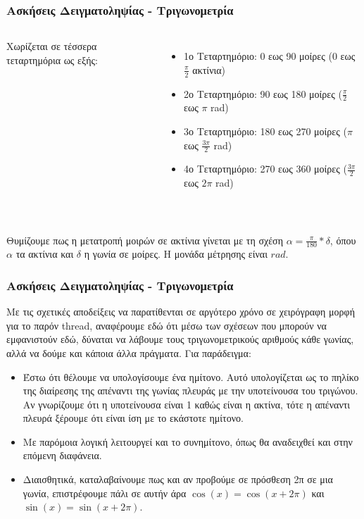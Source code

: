 \documentclass{beamer}
\begin{document}
\begin{frame}
	\frametitle{Ασκήσεις Δειγματοληψίας -  Τριγωνομετρία}
	\begin{columns}
		
		
		\centering
		Χωρίζεται σε τέσσερα τεταρτημόρια ως εξής:
		\begin{itemize}
			\item 1ο Τεταρτημόριο: 0 εως 90 μοίρες ($0$ εως $\frac{\pi}{2}$ ακτίνια)
			\item 2ο Τεταρτημόριο: 90 εως 180 μοίρες ($\frac{\pi}{2}$ εως $\pi$ \textlatin{rad})
			\item 3ο Τεταρτημόριο: 180 εως 270 μοίρες ($\pi$ εως $\frac{3\pi}{2}$ \textlatin{rad})
			\item 4ο Τεταρτημόριο: 270 εως 360 μοίρες ($\frac{3\pi}{2}$ εως $2\pi$ \textlatin{rad})
		 \end{itemize}
	\end{columns}
~\\
Θυμίζουμε πως η μετατροπή μοιρών σε ακτίνια γίνεται με τη σχέση $\alpha = \frac{\pi}{180} * \delta$, όπου $\alpha$ τα ακτίνια και $\delta$ η γωνία σε μοίρες. Η μονάδα μέτρησης είναι $rad$.
\end{frame}

\begin{frame}
	\frametitle{Ασκήσεις Δειγματοληψίας -  Τριγωνομετρία}
	Με τις σχετικές αποδείξεις να παρατίθενται σε αργότερο χρόνο σε χειρόγραφη μορφή για το παρόν \textlatin{thread}, αναφέρουμε εδώ ότι μέσω των σχέσεων που μπορούν να εμφανιστούν εδώ, δύναται να λάβουμε τους τριγωνομετρικούς αριθμούς κάθε γωνίας, αλλά να δούμε και κάποια άλλα πράγματα. Για παράδειγμα:
	\begin{itemize}
		\item Έστω ότι θέλουμε να υπολογίσουμε ένα ημίτονο. Αυτό υπολογίζεται ως το πηλίκο της διαίρεσης της απέναντι της γωνίας πλευράς με την υποτείνουσα του τριγώνου. \pause Αν γνωρίζουμε ότι η υποτείνουσα είναι 1 καθώς είναι η ακτίνα, τότε η απέναντι πλευρά ξέρουμε ότι είναι ίση με το εκάστοτε ημίτονο.
		\item Με παρόμοια λογική λειτουργεί και το συνημίτονο, όπως θα αναδειχθεί και στην επόμενη διαφάνεια.
		\item Διαισθητικά, καταλαβαίνουμε πως και αν προβούμε σε πρόσθεση 2π σε μια γωνία, επιστρέφουμε πάλι σε αυτήν άρα $\cos(x) = \cos(x+2\pi)$ και $\sin(x) = \sin(x+2\pi)$.
	\end{itemize}
\end{frame}
\end{document}
